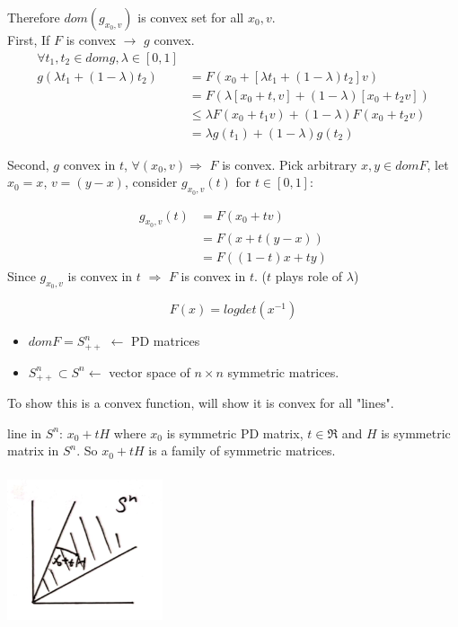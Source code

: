 Therefore $dom(g_{x_0, v})$ is convex set for all $x_0, v$.\\

First, If $F$ is convex $\rightarrow$ $g$ convex. 
\begin{align*}
\forall t_1, t_2\in domg, \lambda\in [0,1]\\
g(\lambda t_1 +(1-\lambda)t_2) &= F(x_0+[\lambda t_1+(1-\lambda)t_2]v)\\
&= F(\lambda[x_0 +t, v]+(1-\lambda)[x_0+t_2v])\\
&\leq \lambda F(x_0+t_1 v)+(1-\lambda)F(x_0+t_2v)\\
&=\lambda g(t_1) + (1-\lambda)g(t_2)
\end{align*}

Second, $g$ convex in $t$, $\forall(x_0, v)\Rightarrow$ $F$ is convex. Pick arbitrary $x,y\in domF$, let $x_0 =x$, $v=(y-x)$, consider $g_{x_0, v}(t)$ for $t\in[0,1]$:

\begin{align*}
g_{x_0, v}(t) &= F(x_0+tv)\\
&= F(x+t(y-x))\\
&= F((1-t)x+ty)
\end{align*}
Since $g_{x_0, v}$ is convex in $t$ $\Rightarrow$ $F$ is convex in $t$. ($t$ plays role of $\lambda$)

\begin{example}
	


\begin{equation*}
F(x) =logdet(x^{-1})
\end{equation*}

\begin{itemize}
	\item $domF = S^n_{++}$ $\leftarrow$ PD matrices
	
	\item $S^n_{++} \subset S^n \leftarrow$ vector space of $n\times n$ symmetric matrices. 
\end{itemize}
To show this is a convex function, will show it is convex for all "lines".

line in $S^n$: $x_0 + tH$ where $x_0$ is symmetric PD matrix, $t\in \Re$ and $H$ is symmetric matrix in $S^n$. So $x_0 + tH$ is a family of symmetric matrices.

\begin{marginfigure}
	\centering
	\includegraphics[width=1.8in,height=1.8in]{figures/ch08/figure1104_3.png}
\end{marginfigure}
\end{example}


